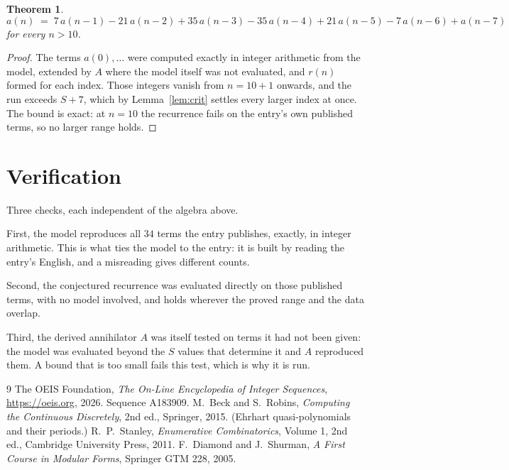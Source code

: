 \documentclass[11pt,a4paper]{article}
\theoremstyle{plain}
\newtheorem{theorem}{Theorem}
\theoremstyle{definition}
\begin{document}
\begin{theorem}
\[
a(n)\;=\;7\,a(n-1) - 21\,a(n-2) + 35\,a(n-3) - 35\,a(n-4) + 21\,a(n-5) - 7\,a(n-6) + a(n-7)
\]
for every $n>10$.
\end{theorem}

\begin{proof}
The terms $a(0),\dots$ were computed exactly in integer arithmetic from the model, extended by
$A$ where the model itself was not evaluated, and $r(n)$ formed for each index. Those integers
vanish from $n=10+1$ onwards, and the run exceeds $S+7$, which by
Lemma~\ref{lem:crit} settles every larger index at once. The bound is exact: at $n=10$ the recurrence fails on the entry's own published terms, so no larger range holds.
\end{proof}

\section{Verification}

Three checks, each independent of the algebra above.

First, the model reproduces all $34$ terms the entry publishes, exactly, in integer
arithmetic. This is what ties the model to the entry: it is built by reading the entry's
English, and a misreading gives different counts.

Second, the conjectured recurrence was evaluated directly on those published terms, with no
model involved, and holds wherever the proved range and the data overlap.

Third, the derived annihilator $A$ was itself tested on terms it had not been given: the model
was evaluated beyond the $S$ values that determine it and $A$ reproduced them. A bound that is
too small fails this test, which is why it is run.

\begin{thebibliography}{9}
 The OEIS Foundation, \emph{The On-Line Encyclopedia of Integer
Sequences}, \url{https://oeis.org}, 2026. Sequence A183909.
 M.~Beck and S.~Robins, \emph{Computing the Continuous Discretely},
2nd ed., Springer, 2015. (Ehrhart quasi-polynomials and their periods.)
 R.~P.~Stanley, \emph{Enumerative Combinatorics}, Volume 1, 2nd ed.,
Cambridge University Press, 2011.
 F.~Diamond and J.~Shurman, \emph{A First Course in Modular Forms},
Springer GTM 228, 2005.
\end{thebibliography}
\end{document}
